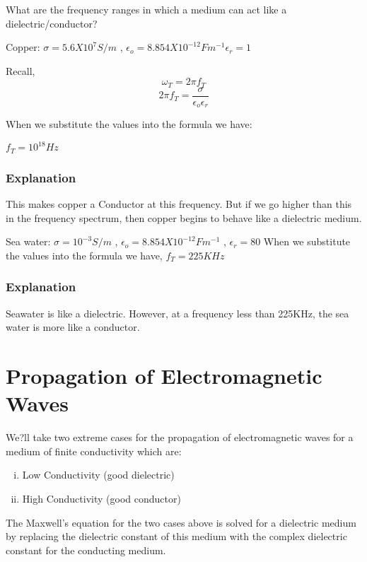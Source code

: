 \begin{exmp}
What are the frequency ranges in which a medium can act like a dielectric/conductor?

Copper: $\sigma = 5.6 X 10^{7}S/m$ , $\epsilon_{o} = 8.854 X 10^{-12}Fm^{-1} \epsilon_{r} = 1$

Recall,
\begin{equation}
\omega_{T} = 2\pi f_{T}
\end{equation}
\begin{equation}
2\pi f_{T} = \dfrac{\sigma}{\epsilon_{o}\epsilon_{r}}
\end{equation}

When we substitute the values into the formula we have:

$f_{T} = 10^{18}Hz$

\subsubsection*{Explanation}
This makes copper a Conductor at this frequency. But if we go higher than this in the frequency spectrum, then copper begins to behave like a dielectric medium.
\end{exmp}

\begin{exmp}
Sea water: $\sigma = 10^{-3}S/m$ , $\epsilon_{o} = 8.854 X 10^{-12}Fm^{-1}$ , $\epsilon_{r} = 80$
When we substitute the values into the formula we have, $f_T=225KHz$

\subsubsection*{Explanation}
Seawater is like a dielectric. However, at a frequency less than 225KHz, the sea water is more like a conductor.
\end{exmp}

\section{Propagation of Electromagnetic Waves}
We?ll take two extreme cases for the propagation of electromagnetic waves for a medium of finite conductivity which are:
\begin{enumerate}[(i)]
\item Low Conductivity (good dielectric)
\item High Conductivity (good conductor)
\end{enumerate}
The Maxwell's equation for the two cases above is solved for a dielectric medium by replacing the dielectric constant of this medium with the complex dielectric constant for the conducting medium. 

